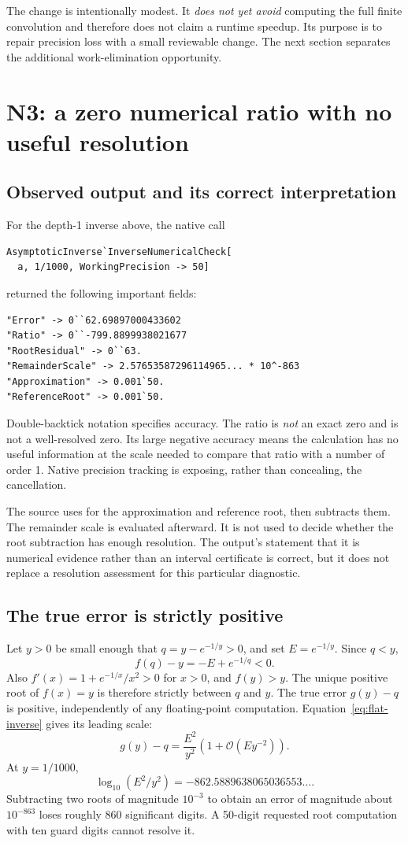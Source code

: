 \documentclass[11pt,letterpaper]{article}
\newcommand{\code}[1]{\texttt{\detokenize{#1}}}
\newcommand{\OO}{\mathcal O}
\begin{document}
The change is intentionally modest. It \emph{does not yet avoid} computing the
full finite convolution and therefore does not claim a runtime speedup.
Its purpose is to repair precision loss with a small reviewable change. The
next section separates the additional work-elimination opportunity.

\section{N3: a zero numerical ratio with no useful resolution}
\label{sec:n3}
\subsection{Observed output and its correct interpretation}
For the depth-1 inverse above, the native call
\begin{lstlisting}
AsymptoticInverse`InverseNumericalCheck[
  a, 1/1000, WorkingPrecision -> 50]
\end{lstlisting}
returned the following important fields:
\begin{lstlisting}
"Error" -> 0``62.69897000433602
"Ratio" -> 0``-799.8899938021677
"RootResidual" -> 0``63.
"RemainderScale" -> 2.57653587296114965... * 10^-863
"Approximation" -> 0.001`50.
"ReferenceRoot" -> 0.001`50.
\end{lstlisting}
Double-backtick notation specifies accuracy. The ratio is \emph{not} an exact
zero and is not a well-resolved zero. Its large negative accuracy means the
calculation has no useful information at the scale needed to compare that
ratio with a number of order 1. Native precision tracking is exposing, rather
than concealing, the cancellation.\cite{wlaccuracy}

The source uses \code{WorkingPrecision + 10} for the approximation and reference
root, then subtracts them. The remainder scale is evaluated afterward. It is
not used to decide whether the root subtraction has enough resolution. The
output's statement that it is numerical evidence rather than an interval
certificate is correct, but it does not replace a resolution assessment for
this particular diagnostic.\cite{numerical}

\subsection{The true error is strictly positive}
Let $y>0$ be small enough that $q=y-e^{-1/y}>0$, and set $E=e^{-1/y}$. Since
$q<y$,
\[
 f(q)-y=-E+e^{-1/q}<0.
\]
Also $f'(x)=1+e^{-1/x}/x^2>0$ for $x>0$, and $f(y)>y$. The unique positive
root of $f(x)=y$ is therefore strictly between $q$ and $y$. The true error
$g(y)-q$ is positive, independently of any floating-point computation.
Equation~\eqref{eq:flat-inverse} gives its leading scale:
\[
 g(y)-q=\frac{E^2}{y^2}\left(1+\OO(Ey^{-2})\right).
\]
At $y=1/1000$,
\[
 \log_{10}(E^2/y^2)=-862.5889638065036553\ldots.
\]
Subtracting two roots of magnitude $10^{-3}$ to obtain an error of magnitude
about $10^{-863}$ loses roughly 860 significant digits. A 50-digit requested
root computation with ten guard digits cannot resolve it.
\end{document}
